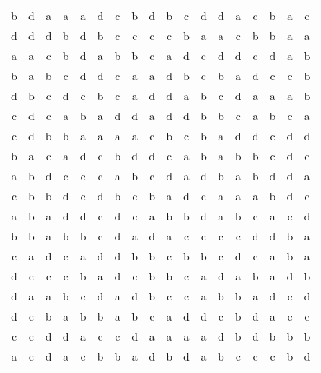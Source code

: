 \begin{tabular}{ |cccccccccccccccccc| }
  \hline                        
b	&d	&a	&a	&a	&d	&c	&b	&d	&b	&c	&d	&d	&a	&c	&b	&a	&c\\
d	&d	&d	&b	&d	&b	&c	&c	&c	&c	&b	&a	&a	&c	&b	&b	&a	&a\\
a	&a	&c	&b	&d	&a	&b	&b	&c	&a	&d	&c	&d	&d	&c	&d	&a	&b\\
b	&a	&b	&c	&d	&d	&c	&a	&a	&d	&b	&c	&b	&a	&d	&c	&c	&b\\
d	&b	&c	&d	&c	&b	&c	&a	&d	&d	&a	&b	&c	&d	&a	&a	&a	&b\\
c	&d	&c	&a	&b	&a	&d	&d	&a	&d	&d	&b	&b	&c	&a	&b	&c	&a\\
c	&d	&b	&b	&a	&a	&a	&a	&c	&b	&c	&b	&a	&d	&d	&c	&d	&d\\
b	&a	&c	&a	&d	&c	&b	&d	&d	&c	&a	&b	&a	&b	&b	&c	&d	&c\\
a	&b	&d	&c	&c	&c	&a	&b	&c	&d	&a	&d	&b	&a	&b	&d	&d	&a\\
c	&b	&b	&d	&c	&d	&b	&c	&b	&a	&d	&c	&a	&a	&a	&b	&d	&c\\
a	&b	&a	&d	&d	&c	&d	&c	&a	&b	&b	&d	&a	&b	&c	&a	&c	&d\\
b	&b	&a	&b	&b	&c	&d	&a	&d	&a	&c	&c	&c	&c	&d	&d	&b	&a\\
c	&a	&d	&c	&a	&d	&d	&b	&b	&c	&b	&b	&c	&d	&c	&a	&b	&a\\
d	&c	&c	&c	&b	&a	&d	&c	&b	&b	&c	&a	&d	&a	&b	&a	&d	&b\\
d	&a	&a	&b	&c	&d	&a	&d	&b	&c	&c	&a	&b	&b	&a	&d	&c	&d\\
d	&c	&b	&a	&b	&b	&a	&b	&c	&a	&d	&d	&c	&b	&d	&a	&c	&c\\
c	&c	&d	&d	&a	&c	&c	&d	&a	&a	&a	&a	&d	&b	&d	&b	&b	&b\\
a	&c	&d	&a	&c	&b	&b	&a	&d	&b	&d	&a	&b	&c	&c	&c	&b	&d\\
  \hline                        


\end{tabular}
